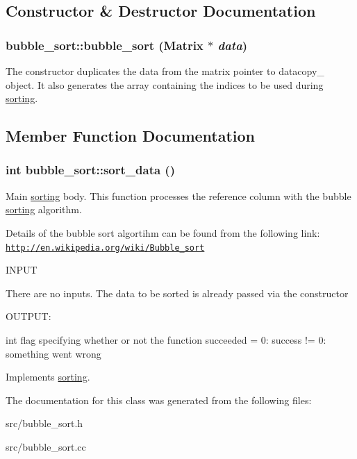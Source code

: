 \subsection{Constructor \& Destructor Documentation}
\hypertarget{classbubble__sort_aa413fc87fd7b9a0da354c0da0bfc0fa2}{
\subsubsection[{bubble\_\-sort}]{\setlength{\rightskip}{0pt plus 5cm}bubble\_\-sort::bubble\_\-sort ({\bf Matrix} $\ast$ {\em data})}}
\label{dc/d2f/classbubble__sort_aa413fc87fd7b9a0da354c0da0bfc0fa2}
The constructor duplicates the data from the matrix pointer to datacopy\_\- object. It also generates the array containing the indices to be used during \hyperlink{classsorting}{sorting}. 

\subsection{Member Function Documentation}
\hypertarget{classbubble__sort_a8fdc845adc8e24bbb169b79ef5140ee2}{
\subsubsection[{sort\_\-data}]{\setlength{\rightskip}{0pt plus 5cm}int bubble\_\-sort::sort\_\-data ()}}
\label{dc/d2f/classbubble__sort_a8fdc845adc8e24bbb169b79ef5140ee2}


Main \hyperlink{classsorting}{sorting} body. This function processes the reference column with the bubble \hyperlink{classsorting}{sorting} algorithm.

Details of the bubble sort algortihm can be found from the following link: \href{http://en.wikipedia.org/wiki/Bubble_sort}{\tt http://en.wikipedia.org/wiki/Bubble\_\-sort}

\begin{DoxyVerb}
  INPUT

  There are no inputs. The data to be sorted is already passed via the constructor

  OUTPUT:

  int         flag specifying whether or not the function succeeded
               = 0: success
	      != 0: something went wrong

  \end{DoxyVerb}
 

Implements \hyperlink{classsorting_a94c4b729732743299f3dcd2505312381}{sorting}.

The documentation for this class was generated from the following files:\begin{DoxyCompactItemize}
\item 
src/bubble\_\-sort.h\item 
src/bubble\_\-sort.cc\end{DoxyCompactItemize}
